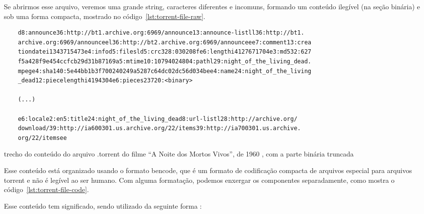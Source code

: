 Se abrirmos esse arquivo, veremos uma grande \gls{string}, caracteres diferentes e
incomuns, formando um conteúdo ilegível (na seção binária) e sob uma forma compacta,
mostrado no código~\ref{lst:torrent-file-raw}.

\begin{listing}[H]
    \begin{verbatim}
    d8:announce36:http://bt1.archive.org:6969/announce13:announce-listll36:http://bt1.
    archive.org:6969/announceel36:http://bt2.archive.org:6969/announceee7:comment13:crea
    tiondatei1343715473e4:infod5:filesld5:crc328:030208fe6:lengthi4127671704e3:md532:627
    f5a428f9e454ccfcb29d31b87169a5:mtime10:10794024804:pathl29:night_of_the_living_dead.
    mpege4:sha140:5e44bb1b3f700240249a5287c64dc02dc56d034bee4:name24:night_of_the_living
    _dead12:piecelengthi4194304e6:pieces23720:<binary>

    (...)

    e6:locale2:en5:title24:night_of_the_living_dead8:url-listl28:http://archive.org/
    download/39:http://ia600301.us.archive.org/22/items39:http://ia700301.us.archive.
    org/22/itemsee
    \end{verbatim}

    \caption{trecho do conteúdo do arquivo .torrent do filme ``A Noite dos Mortos
    Vivos'', de 1960 \cite{torrent-file}, com a parte binária truncada}
    \label{lst:torrent-file-raw}
\end{listing}

Esse conteúdo está organizado usando o formato \gls{bencode}, que é um formato de
codificação compacta de arquivos especial para arquivos \gls*{torrent} e não é legível
ao ser humano. Com alguma formatação, podemos enxergar os componentes separadamente,
como mostra o código~\ref{lst:torrent-file-code}.

Esse conteúdo tem significado, sendo utilizado da seguinte forma
\cite{wikitheory:bencoding}:

